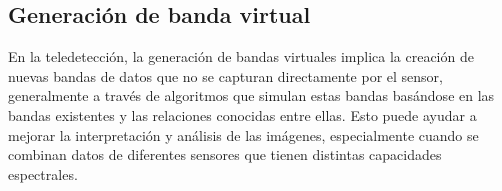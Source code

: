         \subsection{Generación de banda virtual}
            En la teledetección, la generación de bandas virtuales implica la creación de nuevas bandas de datos que no se capturan directamente por el sensor, generalmente a través de algoritmos que simulan estas bandas basándose en las bandas existentes y las relaciones conocidas entre ellas. Esto puede ayudar a mejorar la interpretación y análisis de las imágenes, especialmente cuando se combinan datos de diferentes sensores que tienen distintas capacidades espectrales.